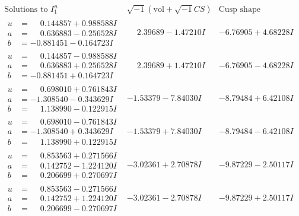 \documentclass[1p]{elsarticle_modified}
\theoremstyle{definition}
\newcommand{\I}{\sqrt{-1}}
\begin{document}
$$\begin{array}{c|c|c}  
\text{Solutions to }I^u_{1}& \I (\text{vol} + \sqrt{-1}CS) & \text{Cusp shape}\\
 \hline 
\begin{aligned}
u &= \phantom{-}0.144857 + 0.988588 I \\
a &= \phantom{-}0.636883 - 0.256528 I \\
b &= -0.881451 - 0.164723 I\end{aligned}
 & \phantom{-}2.39689 - 1.47210 I & -6.76905 + 4.68228 I \\ \hline\begin{aligned}
u &= \phantom{-}0.144857 - 0.988588 I \\
a &= \phantom{-}0.636883 + 0.256528 I \\
b &= -0.881451 + 0.164723 I\end{aligned}
 & \phantom{-}2.39689 + 1.47210 I & -6.76905 - 4.68228 I \\ \hline\begin{aligned}
u &= \phantom{-}0.698010 + 0.761843 I \\
a &= -1.308540 - 0.343629 I \\
b &= \phantom{-}1.138990 - 0.122915 I\end{aligned}
 & -1.53379 - 7.84030 I & -8.79484 + 6.42108 I \\ \hline\begin{aligned}
u &= \phantom{-}0.698010 - 0.761843 I \\
a &= -1.308540 + 0.343629 I \\
b &= \phantom{-}1.138990 + 0.122915 I\end{aligned}
 & -1.53379 + 7.84030 I & -8.79484 - 6.42108 I \\ \hline\begin{aligned}
u &= \phantom{-}0.853563 + 0.271566 I \\
a &= \phantom{-}0.142752 - 1.224120 I \\
b &= \phantom{-}0.206699 + 0.270697 I\end{aligned}
 & -3.02361 + 2.70878 I & -9.87229 - 2.50117 I \\ \hline\begin{aligned}
u &= \phantom{-}0.853563 - 0.271566 I \\
a &= \phantom{-}0.142752 + 1.224120 I \\
b &= \phantom{-}0.206699 - 0.270697 I\end{aligned}
 & -3.02361 - 2.70878 I & -9.87229 + 2.50117 I \\ \hline\begin{aligned}

\end{aligned}
\end{array}$$
\end{document}
